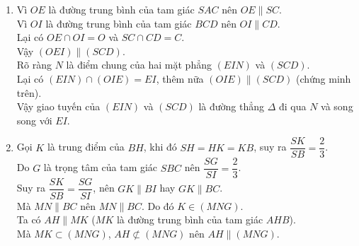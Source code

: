\begin{bt}
\begin{bt}
{\begin{enumerate}
\begin{center}
		\end{center}
		\item Vì $OE$ là đường trung bình của tam giác $SAC$ nên $OE \parallel SC$.\\
		Vì $OI$ là đường trung bình của tam giác $BCD$ nên $OI \parallel CD$.\\
		Lại có $OE \cap OI =O$ và $SC \cap CD = C$.\\
		Vậy $(OEI)\parallel (SCD)$.\\
		Rõ ràng $N$ là điểm chung của hai mặt phẳng $(EIN)$ và $(SCD)$.\\
		Lại có $(EIN) \cap (OIE)=EI$, thêm nữa $(OIE)\parallel (SCD)$ (chứng minh trên).\\
		Vậy giao tuyến của $(EIN)$ và $(SCD)$ là đường thẳng $\Delta$ đi qua  $N$ và song song với $EI$.
		\item Gọi $K$ là trung điểm của $BH$, khi đó $SH=HK=KB$, suy ra $\dfrac{SK}{SB}=\dfrac{2}{3}$.\\
		Do $G$ là trọng tâm của tam giác $SBC$ nên $\dfrac{SG}{SI}=\dfrac{2}{3}$.\\
		Suy ra $\dfrac{SK}{SB}=\dfrac{SG}{SI}$, nên $GK\parallel BI$ hay $GK \parallel BC$.\\
		Mà $MN\parallel BC$ nên $MN \parallel BC$. Do đó $K\in (MNG)$.\\
		Ta có $AH\parallel MK$ ($MK$ là đường trung bình của tam giác $AHB$).\\
		Mà $MK \subset (MNG)$, $AH \not\subset (MNG)$ nên $AH \parallel (MNG)$.
	\end{enumerate}
	
}
\end{bt}


\end{bt}
